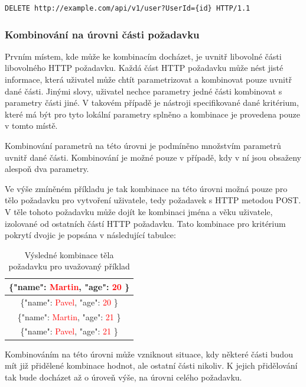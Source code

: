 \begin{lstlisting}[frame=single]
DELETE http://example.com/api/v1/user?UserId={id} HTTP/1.1

\end{lstlisting}

\subsubsection*{Kombinování na úrovni části požadavku}
Prvním místem, kde může ke kombinacím docházet, je uvnitř libovolné části libovolného HTTP požadavku. Každá část HTTP požadavku může nést jisté informace, která uživatel může chtít parametrizovat a kombinovat pouze uvnitř dané části. Jinými slovy, uživatel nechce parametry jedné části kombinovat s parametry části jiné. V takovém případě je nástroji specifikované dané kritérium, které má být pro tyto lokální parametry splněno a kombinace je provedena pouze v tomto místě.

Kombinování parametrů na této úrovni je podmíněno množstvím parametrů uvnitř dané části. Kombinování je možné pouze v případě, kdy v ní jsou obsaženy alespoň dva parametry. 

Ve výše zmíněném příkladu je tak kombinace na této úrovni možná pouze pro tělo požadavku pro vytvoření uživatele, tedy požadavek s HTTP metodou POST. V těle tohoto požadavku může dojít ke kombinaci jména a věku uživatele, izolované od ostatních částí HTTP požadavku. Tato kombinace pro kritérium pokrytí dvojic je popsána v následující tabulce:

\begin{table}[h]
\centering
\begin{tabular}{ |c| } 
 \hline
\{"name": \textcolor{red}{Martin}, "age": \textcolor{red}{20} \} \\
 \hline
\{"name": \textcolor{red}{Pavel}, "age": \textcolor{red}{20} \} \\
 \hline
\{"name": \textcolor{red}{Martin}, "age": \textcolor{red}{21} \} \\ 
 \hline
\{"name": \textcolor{red}{Pavel}, "age": \textcolor{red}{21} \} \\
 \hline
\end{tabular}
\caption{Výsledné kombinace těla požadavku pro uvažovaný příklad}
\label{table_Exampleeeee}
\end{table}



Kombinováním na této úrovni může vzniknout situace, kdy některé části budou mít již přidělené kombinace hodnot, ale ostatní části nikoliv. K jejich přidělování tak bude docházet až o úroveň výše, na úrovni celého požadavku. 



